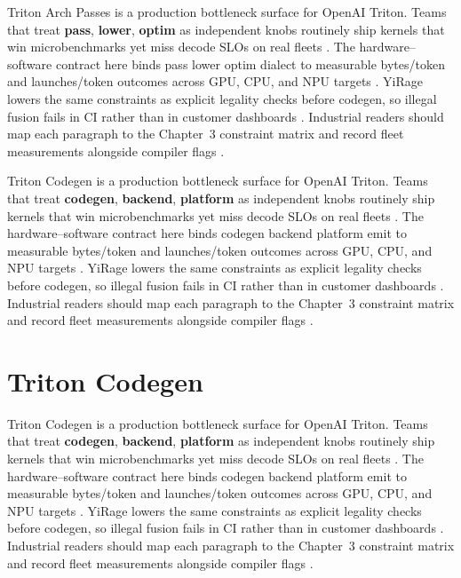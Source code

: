 Triton Arch Passes is a production bottleneck surface for OpenAI Triton. Teams that treat \textbf{pass}, \textbf{lower}, \textbf{optim} as independent knobs routinely ship kernels that win microbenchmarks yet miss decode SLOs on real fleets \citep{patel2025llminference,nvidia2022hopper}. The hardware--software contract here binds pass lower optim dialect to measurable bytes/token and launches/token outcomes across GPU, CPU, and NPU targets \citep{taxbreak2026,semianalysis2024tma}. YiRage lowers the same constraints as explicit legality checks before codegen, so illegal fusion fails in CI rather than in customer dashboards \citep{memoryfloor2026,amd2024xdna}. Industrial readers should map each paragraph to the Chapter~3 constraint matrix and record fleet measurements alongside compiler flags \citep{nvidia2022hopper,amd2024aie}.

Triton Codegen is a production bottleneck surface for OpenAI Triton. Teams that treat \textbf{codegen}, \textbf{backend}, \textbf{platform} as independent knobs routinely ship kernels that win microbenchmarks yet miss decode SLOs on real fleets \citep{taxbreak2026,semianalysis2024tma}. The hardware--software contract here binds codegen backend platform emit to measurable bytes/token and launches/token outcomes across GPU, CPU, and NPU targets \citep{memoryfloor2026,amd2024xdna}. YiRage lowers the same constraints as explicit legality checks before codegen, so illegal fusion fails in CI rather than in customer dashboards \citep{nvidia2022hopper,amd2024aie}. Industrial readers should map each paragraph to the Chapter~3 constraint matrix and record fleet measurements alongside compiler flags \citep{semianalysis2024tma,dlbook}.

\section{Triton Codegen}
\label{sec:triton_codegen}

Triton Codegen is a production bottleneck surface for OpenAI Triton. Teams that treat \textbf{codegen}, \textbf{backend}, \textbf{platform} as independent knobs routinely ship kernels that win microbenchmarks yet miss decode SLOs on real fleets \citep{memoryfloor2026,amd2024xdna}. The hardware--software contract here binds codegen backend platform emit to measurable bytes/token and launches/token outcomes across GPU, CPU, and NPU targets \citep{nvidia2022hopper,amd2024aie}. YiRage lowers the same constraints as explicit legality checks before codegen, so illegal fusion fails in CI rather than in customer dashboards \citep{semianalysis2024tma,dlbook}. Industrial readers should map each paragraph to the Chapter~3 constraint matrix and record fleet measurements alongside compiler flags \citep{amd2024xdna,dao2022flashattention}.


